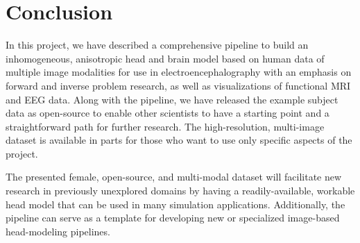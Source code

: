 
\section{Conclusion}
\label{sec:Conclusion}


In this project, we have described a comprehensive pipeline to build an inhomogeneous, anisotropic head and brain model based on human data of multiple image modalities for use in electroencephalography with an emphasis on forward and inverse problem research, as well as visualizations of functional MRI and EEG data. Along with the pipeline, we have released the example subject data as open-source to enable other scientists to have a starting point and a straightforward path for further research. The high-resolution, multi-image dataset is available in parts for those who want to use only specific aspects of the project.

The presented female, open-source, and multi-modal dataset will facilitate new research in previously unexplored domains by having a readily-available, workable head model that can be used in many simulation applications. Additionally, the pipeline can serve as a template for developing new or specialized image-based head-modeling pipelines. 